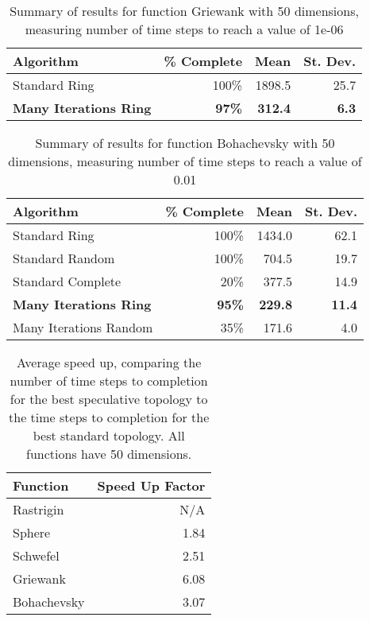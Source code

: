\documentclass[smallcondensed]{svjour3}
\begin{document}
\begin{table}
  \caption{Summary of results for function Griewank with 50 dimensions,
  measuring number of time steps to reach a value of 1e-06}
  \label{tab:griewank-50}
  \centering
  \begin{tabular}{|l|r|r|r|}
  \hline
  Algorithm&\% Complete&Mean&St. Dev.\\
  \hline
  \hline
  Standard Ring&100\%&1898.5&25.7\\
  \hline
  \textbf{Many Iterations Ring}&\textbf{97\%}&\textbf{312.4}&\textbf{6.3}\\
  \hline
  \end{tabular}
\end{table}

\begin{table}
  \caption{Summary of results for function Bohachevsky with 50 dimensions,
  measuring number of time steps to reach a value of 0.01}
  \label{tab:bohachevsky-50}
  \centering
  \begin{tabular}{|l|r|r|r|}
  \hline
  Algorithm&\% Complete&Mean&St. Dev.\\
  \hline
  \hline
  Standard Ring&100\%&1434.0&62.1\\
  \hline
  Standard Random&100\%&704.5&19.7\\
  \hline
  Standard Complete&20\%&377.5&14.9\\
  \hline
  \textbf{Many Iterations Ring}&\textbf{95\%}&\textbf{229.8}&\textbf{11.4}\\
  \hline
  Many Iterations Random&35\%&171.6&4.0\\
  \hline
  \end{tabular}
\end{table}

\begin{table}
  \caption{Average speed up, comparing the number of time steps to completion
  for the best speculative topology to the time steps to completion for the
  best standard topology.  All functions have 50 dimensions.}
  \label{tab:50dims-summary}
  \centering
  \begin{tabular}{|l|r|}
	\hline
	Function&Speed Up Factor\\
	\hline
	Rastrigin&N/A\\
	\hline
	Sphere&1.84\\
	\hline
	Schwefel&2.51\\
	\hline
	Griewank&6.08\\
	\hline
	Bohachevsky&3.07\\
	\hline
  \end{tabular}
\end{table}
\end{document}
